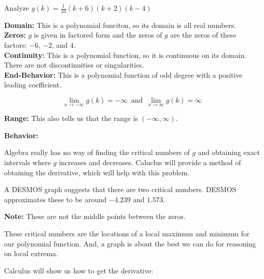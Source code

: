 \documentclass{ximera}
\begin{document}
\begin{example}  Analyze   $g(k) = \frac{1}{10} (k+6)(k+2)(k-4)$


\textbf{Domain: } This is a polynomial funciton, so its domain is all real numbers. \\



\textbf{Zeros: } $g$ is given in factored form and the zeros of $g$ are the zeros of these factors: $-6$, $-2$, and $4$.\\



\textbf{Continuity: } This is a polynomial function, so it is continuous on its domain. There are not discontinuities or singularities.\\



\textbf{End-Behavior: }  This is a polynomial function of odd degree with a positive leading coefficient.


\[  \lim\limits_{x \to -\infty} g(k) = -\infty  \,   \text{ and }     \,   \lim\limits_{x \to \infty} g(k) = \infty    \]



\textbf{Range: } This also tells us that the range is $(-\infty, \infty)$.

\textbf{Behavior: }


Algebra really has no way of finding the critical numbers of $g$ and obtaining exact intervals where $g$ increases and decreases.  Caluclus will provide a method of obtaining the derivative, which will help with this problem. 



A DESMOS graph suggests that there are two critical numbers.  DESMOS approximates these to be around $-4.239$ and $1.573$.

\textbf{Note: } These are not the middle points between the zeros.


These critical numbers are the locations of a local maximum and minimum for our polynomial function.  And, a graph is about the best we can do for reasoning on local extrema.





\begin{center}
\end{center}








Calculus will show us how to get the derivative:


\end{example}
\end{document}
